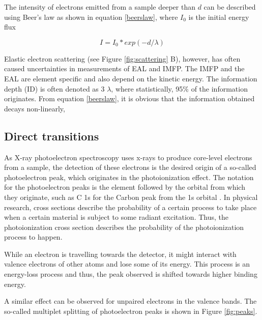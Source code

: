 The intensity of electrons emitted from a sample deeper than $d$ can be described using Beer's law as shown in equation \ref{beerslaw}, where $I_{0}$ is the initial energy flux

\begin{equation}
\label{beerslaw}
    I = I_{0} * exp(-d/\lambda)
\end{equation}

Elastic electron scattering (see Figure \ref{fig:scattering} B), however, has often caused uncertainties in measurements of EAL and IMFP. The IMFP and the EAL are element specific and also depend on the kinetic energy. 
The information depth (ID) is often denoted as 3 $\lambda$, where statistically, 95\% of the information originates. From equation \ref{beerslaw}, it is obvious that the information obtained decays non-linearly, 

\subsection{Direct transitions}
As X-ray photoelectron spectroscopy uses x-rays to produce core-level electrons from a sample, the detection of these electrons is the desired origin of a so-called photoelectron peak, which originates in the photoionization effect. The notation for the photoelectron peaks is the element followed by the orbital from which they originate, such as C 1s for the Carbon peak from the 1s orbital \cite{stevie_introduction_2020}. In physical research, cross sections describe the probability of a certain process to take place when a certain material is subject to some radiant excitation. Thus, the photoionization cross section describes the probability of the photoionization process to happen. 

While an electron is travelling towards the detector, it might interact with valence electrons of other atoms and lose some of its energy. This process is an energy-loss process and thus, the peak observed is shifted towards higher binding energy.

A similar effect can be observed for unpaired electrons in the valence bands. The so-called multiplet splitting of photoelectron peaks is shown in Figure \ref{fig:peaks}.


